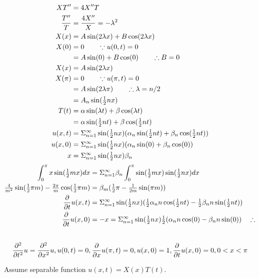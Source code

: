 \documentclass[12pt,USLetter]{article}
\begin{document}
\begin{align*}
XT^{\prime\prime} &= 4X^{\prime\prime} T \\
\frac{T^{\prime\prime}}{T} &= \frac{4X^{\prime\prime}}{X} = -\lambda^2 \\
X(x) &= A\sin(2\lambda x) + B\cos(2\lambda x) \\
X(0) &= 0 \qquad \because u(0,t) = 0 \\
&= A\sin(0) + B\cos(0) \qquad \therefore B = 0 \\
X(x) &= A\sin(2\lambda x) \\
X(\pi) &= 0 \qquad \because u(\pi,t) = 0 \\
&= A\sin(2\lambda\pi) \qquad \therefore \lambda = n/2 \\
&= A_n\sin(\tfrac{1}{2}nx) \\
T(t) &= \alpha\sin(\lambda t) + \beta\cos(\lambda t) \\
&= \alpha\sin(\tfrac{1}{2}nt) + \beta\cos(\tfrac{1}{2}nt) \\
u(x,t) &= \Sigma_{n=1}^{\infty} \sin(\tfrac{1}{2}nx)(\alpha_n\sin(\tfrac{1}{2} nt) + \beta_n\cos(\tfrac{1}{2} nt)) \\
u(x,0) &= \Sigma_{n=1}^{\infty} \sin(\tfrac{1}{2}nx)(\alpha_n\sin(0) + \beta_n\cos(0)) \\
x &= \Sigma_{n=1}^{\infty} \sin(\tfrac{1}{2} nx) \beta_n 
\end{align*}
\begin{align*}
\int_0^\pi x\sin(\tfrac{1}{2} mx) dx &= \Sigma_{n=1}^{\infty} \beta_n \int_0^\pi \sin(\tfrac{1}{2} mx)\sin(\tfrac{1}{2} nx) dx \\
\tfrac{4}{m^2}\sin(\tfrac{1}{2} \pi m) - \tfrac{2\pi}{m}\cos(\tfrac{1}{2} \pi m) 
&= \beta_m (\tfrac{1}{2}\pi - \tfrac{1}{2m}\sin(\pi m)) \\
\frac{\partial}{\partial{t}}u(x,t) &= \Sigma_{n=1}^{\infty} \sin(\tfrac{1}{2} nx) (\tfrac{1}{2}\alpha_nn\cos(\tfrac{1}{2} nt) - \tfrac{1}{2}\beta_nn\sin(\tfrac{1}{2} nt)) \\
\frac{\partial}{\partial{t}}u(x,0) &= -x = \Sigma_{n=1}^{\infty}\sin(\tfrac{1}{2} nx) \tfrac{1}{2}(\alpha_nn\cos(0) - \beta_nn\sin(0)) \quad \therefore  \\
\end{align*}

\subsection{}

\begin{equation*}
\frac{\partial^2}{\partial{t}^2}u = \frac{\partial^2}{\partial{x}^2}u, u(0,t) = 0, \frac{\partial}{\partial{x}}u(\pi, t) = 0, u(x,0) = 1, \frac{\partial}{\partial{t}}u(x,0) = 0, 0<x<\pi
\end{equation*}

Assume separable function $u(x,t) = X(x)T(t)$.
\end{document}
